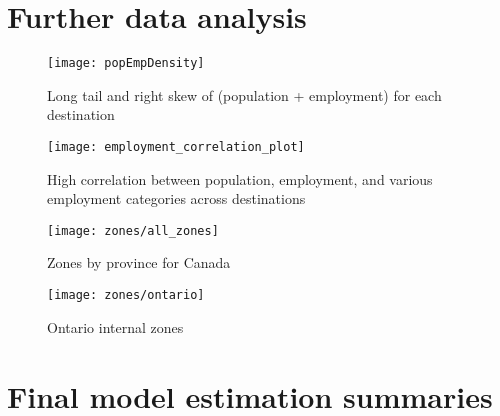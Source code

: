 \chapter{Further data analysis}


\begin{figure}[H]
\centering
\texttt{[image: popEmpDensity]}
\caption{Long tail and right skew of (population + employment) for each destination}
\label{fig:pop-emp-density}
\end{figure}


\begin{figure}[H]
\centering
\texttt{[image: employment\_correlation\_plot]}
\caption{High correlation between population, employment, and various employment categories across destinations}
\label{fig:pop-emp-correlation}
\end{figure}


\clearpage
\begin{sidewaysfigure}
\centering
\texttt{[image: zones/all\_zones]}
\caption{Zones by province for Canada}
\label{fig:all-zones}
\end{sidewaysfigure}
\clearpage

\clearpage
\begin{sidewaysfigure}
\centering
\texttt{[image: zones/ontario]}
\caption{Ontario internal zones}
\label{fig:ontario-zones}
\end{sidewaysfigure}
\clearpage

\chapter{Final model estimation summaries}
